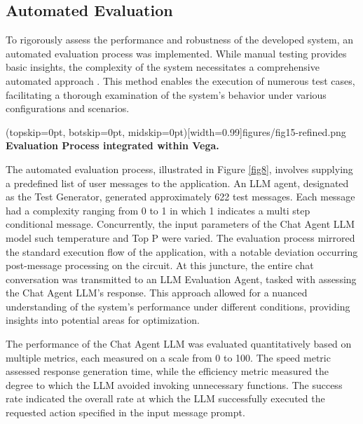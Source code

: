 \documentclass{ieeeaccess}
\begin{document}
\subsection{Automated Evaluation}
To rigorously assess the performance and robustness of the developed system, an automated evaluation process was implemented. While manual testing provides basic insights, the complexity of the system necessitates a comprehensive automated approach \cite{1290484}. This method enables the execution of numerous test cases, facilitating a thorough examination of the system's behavior under various configurations and scenarios.

\Figure[t!](topskip=0pt, botskip=0pt, midskip=0pt)[width=0.99\columnwidth]{{figures/fig15-refined.png}}
{ \textbf{Evaluation Process integrated within Vega.}\label{fig8}}

The automated evaluation process, illustrated in Figure \ref{fig8}, involves supplying a predefined list of user messages to the application. An LLM agent, designated as the Test Generator, generated approximately 622 test messages. Each message had a complexity ranging from 0 to 1 in which 1 indicates a multi step conditional message. Concurrently, the input parameters of the Chat Agent LLM model such temperature and Top P \cite{rum2024setting} were varied. The evaluation process mirrored the standard execution flow of the application, with a notable deviation occurring post-message processing on the circuit. At this juncture, the entire chat conversation was transmitted to an LLM Evaluation Agent, tasked with assessing the Chat Agent LLM's response. This approach allowed for a nuanced understanding of the system's performance under different conditions, providing insights into potential areas for optimization.

The performance of the Chat Agent LLM was evaluated quantitatively based on multiple metrics, each measured on a scale from 0 to 100. The speed metric assessed response generation time, while the efficiency metric measured the degree to which the LLM avoided invoking unnecessary functions. The success rate indicated the overall rate at which the LLM successfully executed the requested action specified in the input message prompt.
\end{document}
